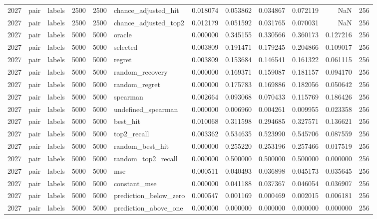 \begin{tabular}{rllrrlrrrrrr}
2027 & pair & labels & 2500 & 2500 & chance_adjusted_hit & 0.018074 & 0.053862 & 0.034867 & 0.072119 & NaN & 256 \\
2027 & pair & labels & 2500 & 2500 & chance_adjusted_top2 & 0.012179 & 0.051592 & 0.031765 & 0.070031 & NaN & 256 \\
2027 & pair & labels & 5000 & 5000 & oracle & 0.000000 & 0.345155 & 0.330566 & 0.360173 & 0.127216 & 256 \\
2027 & pair & labels & 5000 & 5000 & selected & 0.003809 & 0.191471 & 0.179245 & 0.204866 & 0.109017 & 256 \\
2027 & pair & labels & 5000 & 5000 & regret & 0.003809 & 0.153684 & 0.146541 & 0.161322 & 0.061115 & 256 \\
2027 & pair & labels & 5000 & 5000 & random_recovery & 0.000000 & 0.169371 & 0.159087 & 0.181157 & 0.094170 & 256 \\
2027 & pair & labels & 5000 & 5000 & random_regret & 0.000000 & 0.175783 & 0.169886 & 0.182056 & 0.050642 & 256 \\
2027 & pair & labels & 5000 & 5000 & spearman & 0.002664 & 0.093068 & 0.070433 & 0.115769 & 0.186426 & 256 \\
2027 & pair & labels & 5000 & 5000 & undefined_spearman & 0.000000 & 0.006960 & 0.004261 & 0.009955 & 0.023358 & 256 \\
2027 & pair & labels & 5000 & 5000 & best_hit & 0.010068 & 0.311598 & 0.294685 & 0.327571 & 0.136621 & 256 \\
2027 & pair & labels & 5000 & 5000 & top2_recall & 0.003362 & 0.534635 & 0.523990 & 0.545706 & 0.087559 & 256 \\
2027 & pair & labels & 5000 & 5000 & random_best_hit & 0.000000 & 0.255220 & 0.253196 & 0.257466 & 0.017519 & 256 \\
2027 & pair & labels & 5000 & 5000 & random_top2_recall & 0.000000 & 0.500000 & 0.500000 & 0.500000 & 0.000000 & 256 \\
2027 & pair & labels & 5000 & 5000 & mse & 0.000511 & 0.040493 & 0.036898 & 0.045173 & 0.035645 & 256 \\
2027 & pair & labels & 5000 & 5000 & constant_mse & 0.000000 & 0.041188 & 0.037367 & 0.046054 & 0.036907 & 256 \\
2027 & pair & labels & 5000 & 5000 & prediction_below_zero & 0.000547 & 0.001169 & 0.000469 & 0.002015 & 0.006181 & 256 \\
2027 & pair & labels & 5000 & 5000 & prediction_above_one & 0.000000 & 0.000000 & 0.000000 & 0.000000 & 0.000000 & 256 \\

\end{tabular}
